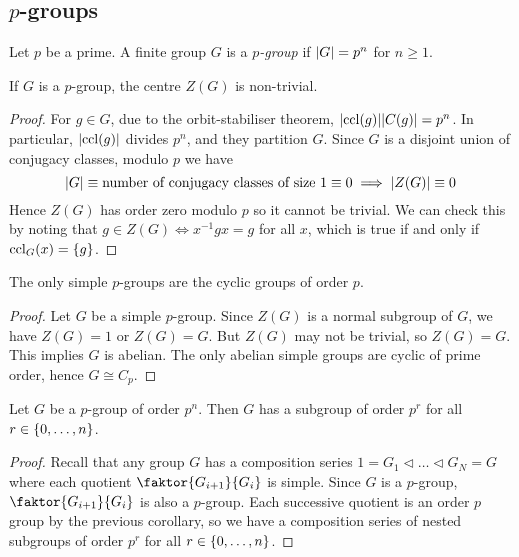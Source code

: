 \subsection{\( p \)-groups}
\begin{definition}
	Let \( p \) be a prime.
	A finite group \( G \) is a \textit{\( p \)-group} if \( \abs{G} = p^n \) for \( n \geq 1 \).
\end{definition}
\begin{theorem}
	If \( G \) is a \( p \)-group, the centre \( Z(G) \) is non-trivial.
\end{theorem}
\begin{proof}
	For \( g \in G \), due to the orbit-stabiliser theorem, \( \abs{\operatorname{ccl}(g)} \abs{C(g)} = p^n \).
	In particular, \( \abs{\operatorname{ccl}(g)} \) divides \( p^n \), and they partition \( G \).
	Since \( G \) is a disjoint union of conjugacy classes, modulo \( p \) we have
	\[
		\abs{G} \equiv \text{number of conjugacy classes of size } 1 \equiv 0 \implies \abs{Z(G)} \equiv 0
	\]
	Hence \( Z(G) \) has order zero modulo \( p \) so it cannot be trivial.
	We can check this by noting that \( g \in Z(G) \iff x^{-1} g x = g \) for all \( x \), which is true if and only if \( \operatorname{ccl}_G(x) = \qty{g} \).
\end{proof}
\begin{corollary}
	The only simple \( p \)-groups are the cyclic groups of order \( p \).
\end{corollary}
\begin{proof}
	Let \( G \) be a simple \( p \)-group.
	Since \( Z(G) \) is a normal subgroup of \( G \), we have \( Z(G) = 1 \) or \( Z(G) = G \).
	But \( Z(G) \) may not be trivial, so \( Z(G) = G \).
	This implies \( G \) is abelian.
	The only abelian simple groups are cyclic of prime order, hence \( G \cong C_p \).
\end{proof}
\begin{corollary}
	Let \( G \) be a \( p \)-group of order \( p^n \).
	Then \( G \) has a subgroup of order \( p^r \) for all \( r \in \qty{0, \dots, n} \).
\end{corollary}
\begin{proof}
	Recall that any group \( G \) has a composition series \( 1 = G_1 \triangleleft \dots \triangleleft G_N = G \) where each quotient \( \faktor{G_{i+1}}{G_i} \) is simple.
	Since \( G \) is a \( p \)-group, \( \faktor{G_{i+1}}{G_i} \) is also a \( p \)-group.
	Each successive quotient is an order \( p \) group by the previous corollary, so we have a composition series of nested subgroups of order \( p^r \) for all \( r \in \qty{0, \dots, n} \).
\end{proof}
